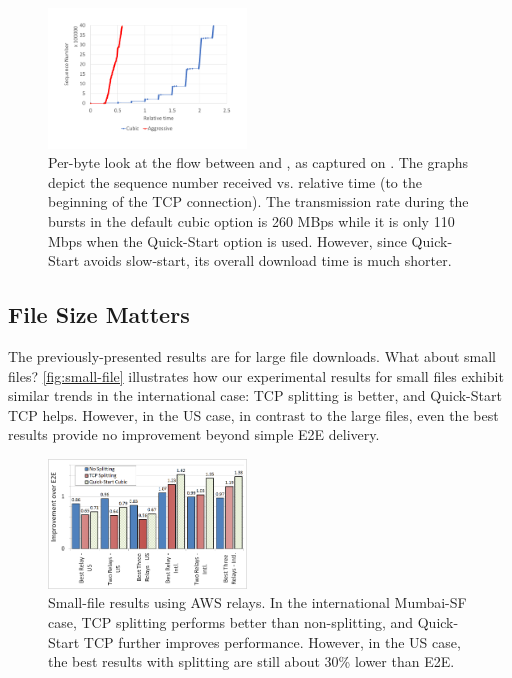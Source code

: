 \documentclass{hotnets17}
\newcommand{\mycomm}[3]{{\color{#2} \textbf{[#1: #3]}}}
\newcommand{\mycomm}[3]{}
\newcommand{\AB}[1]{\mycomm{AB}{Orange}{#1}}
\providecommand{\vs}{vs. }
\begin{document}
\begin{figure}[!t]
  \centering
    \includegraphics[width=0.47\textwidth,trim=2mm 2mm 2mm 2mm,clip]{figures/CubicVsAggressive-seq}
    \caption{Per-byte look at the flow between \rs and \rc, as captured on \rc. The graphs depict the sequence number received \vs relative time (to the beginning of the TCP connection). The transmission rate during the bursts in the default cubic option is 260 MBps while it is only 110 Mbps when the Quick-Start option is used. However, since Quick-Start avoids slow-start, its overall download time is much shorter.  
    }
    \label{fig:agg-vs-cubic}
\end{figure}



\subsection{File Size Matters}
The previously-presented results are for large file downloads. What about small files? \autoref{fig:small-file} illustrates how our experimental results for small files exhibit similar trends in the international case: TCP splitting is better, and Quick-Start TCP helps. However, in the US case, in contrast to the large files, even the best results provide no improvement beyond simple E2E delivery. 

\begin{figure}[t]
  \centering
    \includegraphics[width=0.47\textwidth,trim=2mm 2mm 2mm 2mm,clip]{figures/small_file}
    \caption{Small-file results using AWS relays. In the international Mumbai-SF case, TCP splitting performs better than non-splitting, and Quick-Start TCP further improves performance. However, in the US case, the best  results with splitting are still about 30\% lower than E2E.}
    \label{fig:small-file}
\end{figure}
\end{document}
